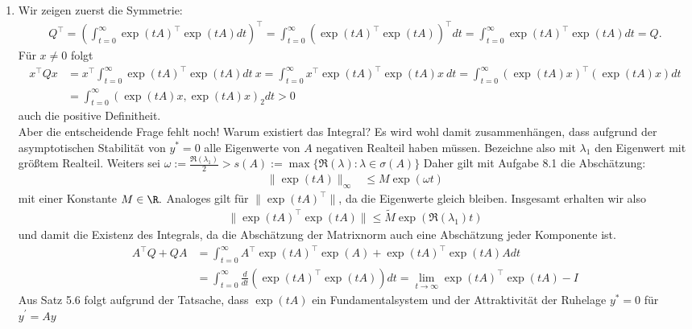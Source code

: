 \begin{solution}
\begin{enumerate}[label = \textbf{\alph*)}]
  \item Wir zeigen zuerst die Symmetrie:
  \begin{align*}
    Q^{\top} = \left(\int_{t = 0}^{\infty} \exp(tA)^{\top}\exp(tA) dt\right)^{\top}
    = \int_{t = 0}^{\infty} \left(\exp(tA)^{\top}\exp(tA)\right)^{\top} dt
    = \int_{t = 0}^{\infty} \exp(tA)^{\top}\exp(tA) dt = Q.
  \end{align*}
  Für $x \neq 0$ folgt
  \begin{align*}
    x^{\top}Qx &= x^{\top}\int_{t = 0}^{\infty} \exp(tA)^{\top}\exp(tA) dt~x
    = \int_{t = 0}^{\infty} x^{\top}\exp(tA)^{\top}\exp(tA) x~ dt
    = \int_{t = 0}^{\infty} (\exp(tA)x)^{\top}(\exp(tA)x) dt \\
    &= \int_{t = 0}^{\infty} (\exp(tA)x,\exp(tA)x)_2 dt > 0
  \end{align*}
  auch die positive Definitheit. \\
  Aber die entscheidende Frage fehlt noch! Warum existiert das Integral?
  Es wird wohl damit zusammenhängen, dass aufgrund der asymptotischen Stabilität
  von $y^* = 0$ alle Eigenwerte von $A$ negativen Realteil haben müssen.
  Bezeichne also mit $\lambda_1$ den Eigenwert mit größtem Realteil.
  Weiters sei $\omega := \frac{\Re(\lambda_1)}{2} > s(A) := \max \{\Re(\lambda): \lambda \in \sigma(A)\}$
  Daher gilt mit Aufgabe 8.1 die Abschätzung:
  \begin{align*}
    \|\exp(tA)\|_{\infty} &\leq  M\exp(\omega t)
  \end{align*}
  mit einer Konstante $M \in \R.$
  Analoges gilt für $\|\exp(tA)^{\top}\|$, da die Eigenwerte gleich bleiben. Insgesamt erhalten wir also
  \begin{align*}
    \|\exp(tA)^{\top}\exp(tA)\| \leq \widetilde{M}\exp(\Re(\lambda_1) t)
  \end{align*}
  und damit die Existenz des Integrals, da die Abschätzung der Matrixnorm auch
  eine Abschätzung jeder Komponente ist.
  \begin{align*}
    A^{\top}Q + QA &= \int_{t = 0}^{\infty} A^{\top}\exp(tA)^{\top}\exp(A) + \exp(tA)^{\top}\exp(tA)Adt \\
    &= \int_{t = 0}^{\infty} \frac{d}{dt}(\exp(tA)^{\top}\exp(tA)) dt
    = \lim_{t \to \infty} \exp(tA)^{\top}\exp(tA) - I
  \end{align*}
  Aus Satz 5.6 folgt aufgrund der Tatsache, dass $\exp(tA)$ ein Fundamentalsystem
  und der Attraktivität der Ruhelage $y^* = 0$ für $y^{\prime} = Ay$

\end{enumerate}
\end{solution}
